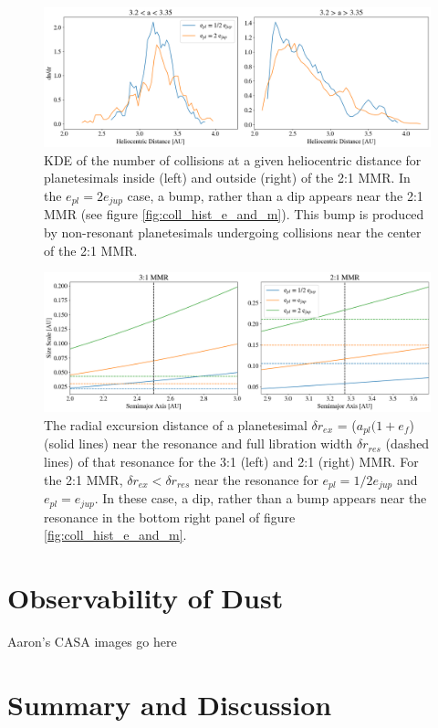 \documentclass[onecolumn]{aastex63}
\begin{document}
\begin{figure}
    \begin{center}
    \includegraphics[width=\textwidth]{figures/coll_hist_r_inout_res.png}
    \caption{KDE of the number of collisions at a given heliocentric distance for planetesimals inside (left) and outside (right) of the 2:1 MMR. In the $e_{pl} = 2 e_{jup}$ case, a bump, rather than a dip appears near the 2:1 MMR (see figure \ref{fig:coll_hist_e_and_m}). This bump is produced by non-resonant planetesimals undergoing collisions near the center of the 2:1 MMR.\label{fig:coll_hist_r_inout_res}}
    \end{center}
\end{figure}

\begin{figure}
    \begin{center}
    \includegraphics[width=\textwidth]{figures/wander_res_scale.png}
    \caption{The radial excursion distance of a planetesimal $\delta r_{ex}$ =  ($a_{pl} (1 + e_{f}$) (solid lines) near the resonance and full libration width $\delta r_{res}$ (dashed lines) of that resonance for the 3:1 (left) and 2:1 (right) MMR. For the 2:1 MMR, $\delta r_{ex} < \delta r _{res}$ near the resonance for $e_{pl} = 1/2 e_{jup}$ and $e_{pl} = e_{jup}$. In these case, a dip, rather than a bump appears near the resonance in the bottom right panel of figure \ref{fig:coll_hist_e_and_m}. \label{fig:wander_res_scale}}
    \end{center}
\end{figure}

\section{Observability of Dust} \label{sec:dust}

Aaron's CASA images go here

\section{Summary and Discussion} \label{sec:discuss}



\clearpage
\end{document}
